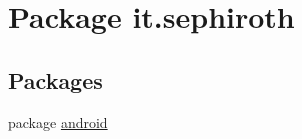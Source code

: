 \hypertarget{namespaceit_1_1sephiroth}{}\section{Package it.\+sephiroth}
\label{namespaceit_1_1sephiroth}
\subsection*{Packages}
\begin{DoxyCompactItemize}
\item 
package \hyperlink{namespaceit_1_1sephiroth_1_1android}{android}
\end{DoxyCompactItemize}
